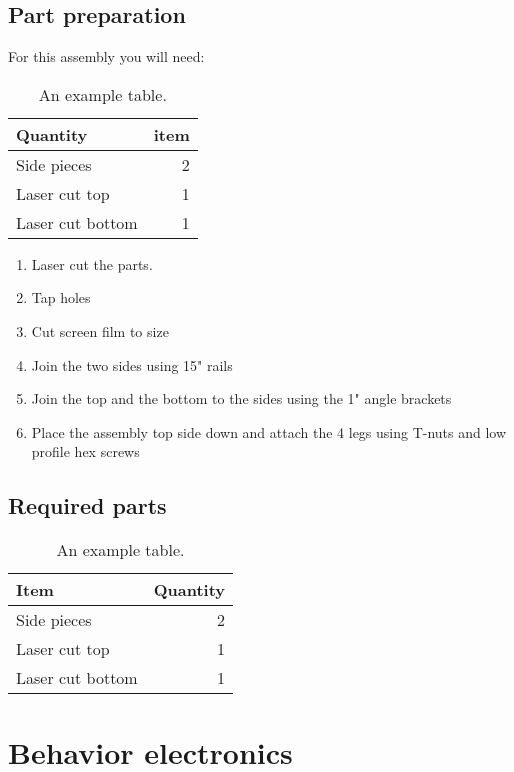 \documentclass[letter]{article}
\begin{document}
\subsection{Part preparation}
For this assembly you will need:
\begin{table}
\centering
\begin{tabular}{l|r}
Quantity & item \\\hline
Side pieces & 2 \\
Laser cut top & 1 \\
Laser cut bottom & 1 \\

\end{tabular}
\caption{\label{tab:widgets}An example table.}
\end{table}

\begin{enumerate}
    \item Laser cut the parts. 
    \item Tap holes
    \item Cut screen film to size
    \item Join the two sides using 15" rails
    \item Join the top and the bottom to the sides using the 1" angle brackets
    \item Place the assembly top side down and attach the 4 legs using T-nuts and low profile hex screws
    
\end{enumerate}

\subsection{Required parts}




\begin{table}
\centering
\begin{tabular}{l|r}
Item & Quantity \\\hline
Side pieces & 2 \\
Laser cut top & 1 \\
Laser cut bottom & 1 \\

\end{tabular}
\caption{\label{tab:widgets}An example table.}
\end{table}

\section{Behavior electronics}
\end{document}
